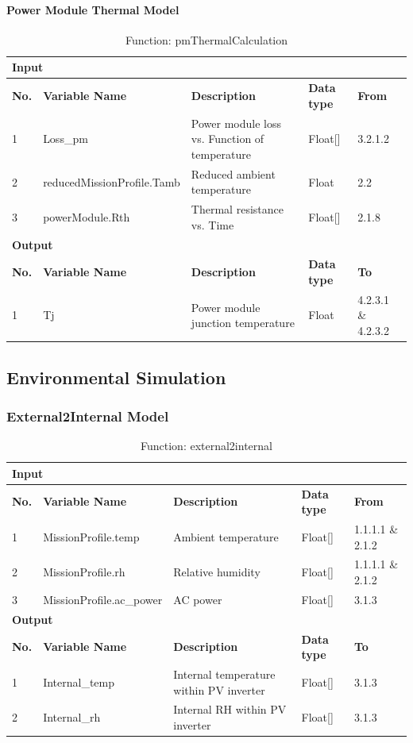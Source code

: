 \documentclass{article}
\begin{document}
\paragraph{Power Module Thermal Model}
\begin{table}[h]
\centering
\caption{Function: pmThermalCalculation}
\begin{tabular}{|l|l|p{6cm}|l|l|}
\hline
\multicolumn{5}{|l|}{\textbf{Input}} \\ \hline
\textbf{No.} & \textbf{Variable Name} & \textbf{Description} & \textbf{Data type} & \textbf{From} \\ \hline
1 & Loss\_pm & Power module loss vs. Function of temperature & Float[] & 3.2.1.2 \\ \hline
2 & reducedMissionProfile.Tamb & Reduced ambient temperature & Float & 2.2 \\ \hline
3 & powerModule.Rth & Thermal resistance vs. Time & Float[] & 2.1.8 \\ \hline
\multicolumn{5}{|l|}{\textbf{Output}} \\ \hline
\textbf{No.} & \textbf{Variable Name} & \textbf{Description} & \textbf{Data type} & \textbf{To} \\ \hline
1 & Tj & Power module junction temperature & Float & 4.2.3.1 \& 4.2.3.2 \\ \hline
\end{tabular}
\end{table}

\subsection{Environmental Simulation}
\subsubsection{External2Internal Model}
\begin{table}[h]
\centering
\caption{Function: external2internal}
\begin{tabular}{|l|l|p{5cm}|l|l|}
\hline
\multicolumn{5}{|l|}{\textbf{Input}} \\ \hline
\textbf{No.} & \textbf{Variable Name} & \textbf{Description} & \textbf{Data type} & \textbf{From} \\ \hline
1 & MissionProfile.temp & Ambient temperature & Float[] & 1.1.1.1 \& 2.1.2 \\ \hline
2 & MissionProfile.rh & Relative humidity & Float[] & 1.1.1.1 \& 2.1.2 \\ \hline
3 & MissionProfile.ac\_power & AC power & Float[] & 3.1.3 \\ \hline
\multicolumn{5}{|l|}{\textbf{Output}} \\ \hline
\textbf{No.} & \textbf{Variable Name} & \textbf{Description} & \textbf{Data type} & \textbf{To} \\ \hline
1 & Internal\_temp & Internal temperature within PV inverter & Float[] & 3.1.3 \\ \hline
2 & Internal\_rh & Internal RH within PV inverter & Float[] & 3.1.3 \\ \hline
\end{tabular}
\end{table}
\end{document}
